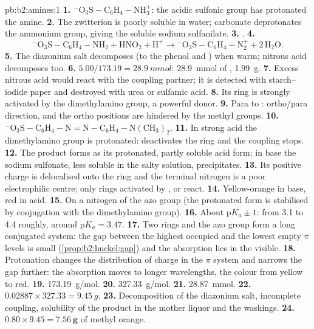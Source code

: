 \begin{solution}{pb:b2:amines:1}
\textbf{1.} $\mathrm{{}^-O_3S{-}C_6H_4{-}NH_3^+}$: the acidic sulfonic group has protonated the amine.
\textbf{2.} The zwitterion is poorly soluble in water; carbonate deprotonates the ammonium group,
giving the soluble sodium sulfanilate.
\textbf{3.} .
\textbf{4.}
\[
  \mathrm{{}^-O_3S{-}C_6H_4{-}NH_2 + HNO_2 + H^+ \to {}^-O_3S{-}C_6H_4{-}N_2^+ + 2\,H_2O} .
\]
\textbf{5.} The diazonium salt decomposes (to the phenol and ) when warm; nitrous acid
decomposes too.
\textbf{6.} $5.00/173.19 = \qty{28.9}{mmol}$: \qty{28.9}{mmol} of , \qty{1.99}{g}.
\textbf{7.} Excess nitrous acid would react with the coupling partner; it is detected with starch--iodide
paper and destroyed with urea or sulfamic acid.
\textbf{8.} Its ring is strongly activated by the dimethylamino group, a powerful donor.
\textbf{9.} Para to : ortho/para direction, and the ortho positions are hindered by the
methyl groups.
\textbf{10.} $\mathrm{{}^-O_3S{-}C_6H_4{-}N{=}N{-}C_6H_4{-}N(CH_3)_2}$.
\textbf{11.} In strong acid the dimethylamino group is protonated:  deactivates the ring
and the coupling stops.
\textbf{12.} The product forms as its protonated, partly soluble acid form; in base the sodium
sulfonate, less soluble in the salty solution, precipitates.
\textbf{13.} Its positive charge is delocalised onto the ring and the terminal nitrogen is a poor
electrophilic centre; only rings activated by ,  or  react.
\textbf{14.} Yellow-orange in base, red in acid.
\textbf{15.} On a nitrogen of the azo group (the protonated form is stabilised by conjugation with
the dimethylamino group).
\textbf{16.} About $\mathrm pK_a \pm 1$: from 3.1 to 4.4 roughly, around $\mathrm pK_a = 3.47$.
\textbf{17.} Two rings and the azo group form a long conjugated system: the gap between the highest
occupied and the lowest empty $\pi$ levels is small (\cref{prop:b2:huckel:gap}) and the absorption
lies in the visible.
\textbf{18.} Protonation changes the distribution of charge in the $\pi$ system and narrows the gap
further: the absorption moves to longer wavelengths, the colour from yellow to red.
\textbf{19.} \qty{173.19}{g/mol}.
\textbf{20.} \qty{327.33}{g/mol}.
\textbf{21.} \qty{28.87}{mmol}.
\textbf{22.} $0.02887 \times 327.33 = \qty{9.45}{g}$.
\textbf{23.} Decomposition of the diazonium salt, incomplete coupling, solubility of the product in
the mother liquor and the washings.
\textbf{24.} $0.80 \times 9.45 = \boldsymbol{\qty{7.56}{g}}$ of methyl orange.
\end{solution}

